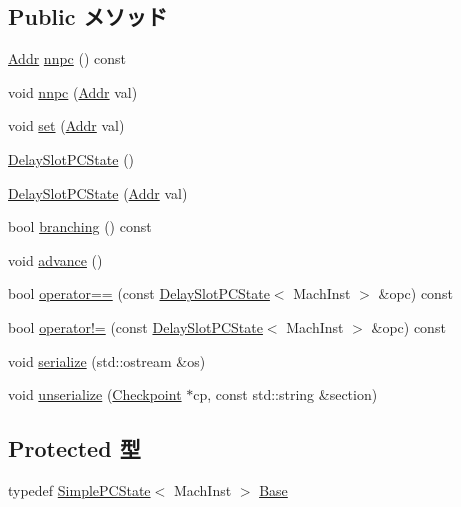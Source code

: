 \subsection*{Public メソッド}
\begin{DoxyCompactItemize}
\item 
\hyperlink{base_2types_8hh_af1bb03d6a4ee096394a6749f0a169232}{Addr} \hyperlink{classGenericISA_1_1DelaySlotPCState_af8c8ed8f237bb3c44902919fb4b6b1a4}{nnpc} () const 
\item 
void \hyperlink{classGenericISA_1_1DelaySlotPCState_aa271f07c4f1ca1fd242d543380f7e589}{nnpc} (\hyperlink{base_2types_8hh_af1bb03d6a4ee096394a6749f0a169232}{Addr} val)
\item 
void \hyperlink{classGenericISA_1_1DelaySlotPCState_a9a5b900e841dd75dc81970850547918f}{set} (\hyperlink{base_2types_8hh_af1bb03d6a4ee096394a6749f0a169232}{Addr} val)
\item 
\hyperlink{classGenericISA_1_1DelaySlotPCState_a15af51f460b55a13caae04a26df39fe6}{DelaySlotPCState} ()
\item 
\hyperlink{classGenericISA_1_1DelaySlotPCState_acd4d05536ddd4b3edb8afa3ff0708151}{DelaySlotPCState} (\hyperlink{base_2types_8hh_af1bb03d6a4ee096394a6749f0a169232}{Addr} val)
\item 
bool \hyperlink{classGenericISA_1_1DelaySlotPCState_ae3f0eb15a9382eefff6b00cf7999c2e3}{branching} () const 
\item 
void \hyperlink{classGenericISA_1_1DelaySlotPCState_a8903a4e9f3d5fb42d0faa9d53e21d85c}{advance} ()
\item 
bool \hyperlink{classGenericISA_1_1DelaySlotPCState_ac87333e7d41d689a69647582933c9985}{operator==} (const \hyperlink{classGenericISA_1_1DelaySlotPCState}{DelaySlotPCState}$<$ MachInst $>$ \&opc) const 
\item 
bool \hyperlink{classGenericISA_1_1DelaySlotPCState_aaa54c276268b580f71a09be1cca39cc5}{operator!=} (const \hyperlink{classGenericISA_1_1DelaySlotPCState}{DelaySlotPCState}$<$ MachInst $>$ \&opc) const 
\item 
void \hyperlink{classGenericISA_1_1DelaySlotPCState_a53e036786d17361be4c7320d39c99b84}{serialize} (std::ostream \&os)
\item 
void \hyperlink{classGenericISA_1_1DelaySlotPCState_af22e5d6d660b97db37003ac61ac4ee49}{unserialize} (\hyperlink{classCheckpoint}{Checkpoint} $\ast$cp, const std::string \&section)
\end{DoxyCompactItemize}
\subsection*{Protected 型}
\begin{DoxyCompactItemize}
\item 
typedef \hyperlink{classGenericISA_1_1SimplePCState}{SimplePCState}$<$ MachInst $>$ \hyperlink{classGenericISA_1_1DelaySlotPCState_a6d61e15302422cb743d88ee2ca4fd482}{Base}
\end{DoxyCompactItemize}
